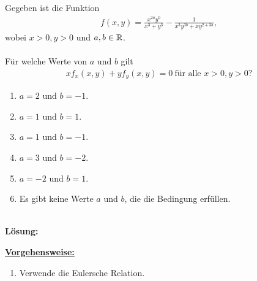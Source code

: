 \subsection*{}
Gegeben ist die Funktion
\begin{align*}
	f(x,y)
	=
	\frac{x^{2a} y^b}{x^3 +y^3}
	- 
	\frac{1}{x^3 y^{3b} + x y^{2 + 3b}},
\end{align*}
wobei $ x > 0, y > 0 $ und $ a,b \in \mathbb{R} $.\\
\\
Für welche Werte von $ a $ und $ b $ gilt
\begin{align*}
	x f_x(x,y) + y f_y(x,y) = 0 \ \textrm{für alle } x>0, y>0\textrm{?}
\end{align*}
\renewcommand{\labelenumi}{(\alph{enumi})}
\begin{enumerate}
	\item 
	$a = 2$ und $ b=-1 $.
	\item
	$a = 1$ und $ b=1 $.
	\item
	$a = 1$ und $ b=-1 $.
	\item
	$a = 3$ und $ b=-2 $.
	\item
	$a = -2$ und $ b=1 $.
	\item
	Es gibt keine Werte $ a $ und $ b $, die die Bedingung erfüllen.
\end{enumerate}
\ \\
\textbf{Lösung:}
\begin{mdframed}
\underline{\textbf{Vorgehensweise:}}
\renewcommand{\labelenumi}{\theenumi.}
\begin{enumerate}
\item Verwende die Eulersche Relation.
\end{enumerate}
\end{mdframed}

